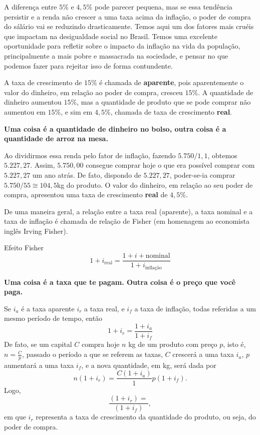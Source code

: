 A diferença entre $5$\% e $4{,}5$\% pode parecer pequena, mas se essa tendência persistir e a renda não crescer a uma taxa acima da inflação, o poder de compra do sálário vai se reduzindo drasticamente. Temos aqui um dos fatores mais cruéis que impactam na desigualdade social no Brasil. Temos uma excelente oportunidade para refletir sobre o impacto da inflação na vida da população, principalmente a mais pobre e massacrada na sociedade, e pensar no que podemos fazer para rejeitar isso de forma contundente.

A taxa de crescimento de $15$\% é chamada de \textbf{aparente}, pois aparentemente o valor do dinheiro, em relação ao poder de compra, cresceu $15$\%. A quantidade de dinheiro aumentou $15$\%, mas a quantidade de produto que se pode comprar não aumentou em $15$\%, e sim em $4{,}5$\%, chamada de taxa de crescimento \textbf{real}. 

\textbf{Uma coisa é a quantidade de dinheiro no bolso, outra coisa é a quantidade de arroz na mesa.}

Ao dividirmos essa renda pelo fator de inflação, fazendo $5.750/1{,}1$, obtemos $5.227{,}27$. Assim, $5.750{,}00$ consegue comprar hoje o que era possível comprar com $5.227{,}27$ um ano atrás. De fato, dispondo de $5.227{,}27$, poder-se-ia comprar $5.750/55\cong 104{,}5$kg do produto. O valor do dinheiro, em relação ao seu poder de compra, apresentou uma taxa de crescimento \textbf{real} de $4{,}5$\%.

De uma maneira geral, a relação entre a taxa real (aparente), a taxa nominal e a taxa de inflação é chamada de relação de Fisher (em homenagem ao economista inglês Irving Fisher).

\begin{center}
Efeito Fisher
\begin{equation*}
1+i_{\text{real}}=\frac{1+i+{\text{nominal}}}{1+i_{\text{inflação}}}
\end{equation*}
\end{center}

\textbf{Uma coisa é a taxa que te pagam. Outra coisa é o preço que você paga.}

\needspace{.25\textheight}
\begin{knowledge}
Se $i_a$ é a taxa aparente $i_r$ a taxa real, e $i_f$ a taxa de inflação, todas referidas a um mesmo período de tempo, então
\begin{equation*}
1+i_r=\frac{1+i_a}{1+i_f}
\end{equation*}
De fato, se um capital $C$ compra hoje $n$ kg de um produto com preço $p$, isto é, $\displaystyle n=\frac{C}{p}$, passado o período a que se referem as taxas, $C$ crescerá a uma taxa $i_a$, $p$ aumentará a uma taxa $i_f$, e a nova quantidade, em kg, será dada por
\begin{equation*}
n(1+i_r)=\frac{C(1+i_a)}1{p(1+i_f)}.
\end{equation*}
Logo,
\begin{equation*}
\frac{(1+i_r)=}{(1+i_f)},
\end{equation*}
em que $i_r$ representa a taxa de crescimento da quantidade do produto, ou seja, do poder de compra.
\end{knowledge}


